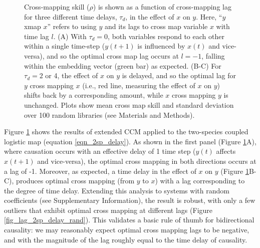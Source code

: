 \begin{figure}[!ht]
{Cross-mapping skill ($\rho$) is shown as a function of cross-mapping lag for three different time delays, $\tau_d$, in the effect of $x$ on $y$. Here, ``$y$ xmap $x$'' refers to using $y$ and its lags to cross map variable $x$ with time lag $l$. (A) With $\tau_d = 0$, both variables respond to each other within a single time-step ($y(t+1)$ is influenced by $x(t)$ and vice-versa), and so the optimal cross map lag occurs at $l = -1$, falling within the embedding vector (green bar) as expected. (B-C) For $\tau_d = 2$ or 4, the effect of $x$ on $y$ is delayed, and so the optimal lag for $y$ cross mapping $x$ (i.e., red line, measuring the effect of $x$ on $y$) shifts back by a corresponding amount, while $x$ cross mapping $y$ is unchanged. Plots show mean cross map skill and standard deviation over 100 random libraries (see Materials and Methods).}
\label{fig_lag_2sp_delay}
\end{figure}

Figure \ref{fig_lag_2sp_delay} shows the results of extended CCM applied to the two-species coupled logistic map (equation \ref{eqn_2sp_delay}). As shown in the first panel (Figure \ref{fig_lag_2sp_delay}A), where causation occurs with an effective delay of 1 time step ($y(t)$ affects $x(t+1)$ and vice-versa), the optimal cross mapping in both directions occurs at a lag of -1. Moreover, as expected, a time delay in the effect of $x$ on $y$ (Figure \ref{fig_lag_2sp_delay}B-C), produces optimal cross mapping (from $y$ to $x$) with a lag corresponding to the degree of time delay. Extending this analysis to systems with random coefficients (see Supplementary Information), the result is robust, with only a few outliers that exhibit optimal cross mapping at different lags (Figure \ref{fig_lag_2sp_delay_rand}). This validates a basic rule of thumb for bidirectional causality: we may reasonably expect optimal cross mapping lags to be negative, and with the magnitude of the lag roughly equal to the time delay of causality.

